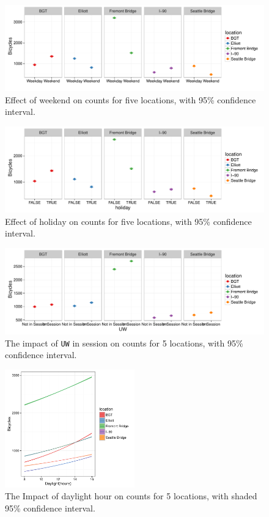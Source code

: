 \documentclass [11pt, proquest] {uwthesis}[2015/03/03]
\begin{document}
\begin{figure}
  \includegraphics[width=1\textwidth]{figures/5sites/Sim_wknd} 
 \caption{Effect of weekend on counts for five locations, with 95\% confidence interval. }
 \label{fig:Sim_wknd}
\end{figure}

\begin{figure}
  \includegraphics[width=1\textwidth]{figures/5sites/Sim_ho} 
 \caption{Effect of holiday on counts for five locations, with 95\% confidence interval.}
 \label{fig:Sim_holiday}
\end{figure}


\begin{figure}
  \includegraphics[width=1\textwidth]{figures/5sites/Sim_UW} 
 \caption{The impact of \texttt{UW} in session on counts for 5 locations, with 95\% confidence interval. }
 \label{fig:Sim_UW}
\end{figure}

\begin{figure}
  \centering
  \includegraphics[width=0.5\textwidth]{figures/5sites/Sim_daylight} 
 \caption{The Impact of daylight hour on counts for 5 locations, with shaded 95\% confidence interval.}
 \label{fig:Sim_daylight}
\end{figure}
\end{document}
